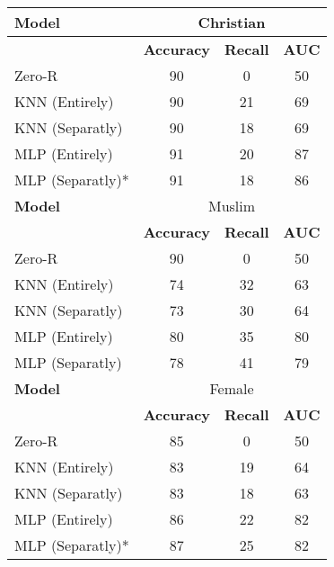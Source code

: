 \documentclass[11pt,twocolumn]{article}
\begin{document}
\begin{table}[h]
\begin{center}
\begin{tabular}{|l |c c c|}
      
      \hline
      \textbf{Model}          & \multicolumn{3}{c|}{Christian} \\
      \hline
      \textbf{}          & \textbf{Accuracy} & \textbf{Recall} & \textbf{AUC} \\
      Zero-R                  & 90             & 0             & 50        \\
      KNN (Entirely)          & 90              & 21            & 69      \\
      KNN (Separatly)         & 90              & 18            & 69             \\
      MLP (Entirely)          & 91              & 20            & 87             \\
      MLP (Separatly)*         & 91             & 18           & 86             \\

\hline
\textbf{Model}          & \multicolumn{3}{c|}{Muslim} \\
      \hline
      \textbf{}          & \textbf{Accuracy} & \textbf{Recall} & \textbf{AUC} \\
      Zero-R                  & 90              & 0             & 50        \\
      KNN (Entirely)          & 74              & 32           & 63    \\
      KNN (Separatly)         & 73              & 30            &64              \\
      MLP (Entirely)          & 80              & 35            &80              \\
      MLP (Separatly)         & 78              & 41            &79             \\
      
      \hline
      \textbf{Model}          & \multicolumn{3}{c|}{Female} \\
      \hline
      \textbf{}          & \textbf{Accuracy} & \textbf{Recall} & \textbf{AUC} \\
      Zero-R                  & 85            & 0          & 50       \\
      KNN (Entirely)          & 83          & 19          & 64    \\
      KNN (Separatly)         & 83            & 18          & 63             \\
      MLP (Entirely)          & 86          & 22          & 82             \\
      MLP (Separatly)*         & 87         & 25        & 82             \\
      \hline


\end{tabular}
\end{center}
\end{table}
\end{document}
